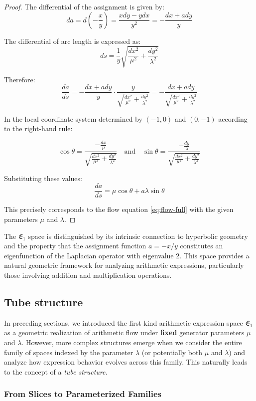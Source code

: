 \documentclass[12pt]{article}
\begin{document}
\begin{proof}
The differential of the assignment is given by:
$$
da = d\left(-\frac{x}{y}\right) = \frac{xdy - ydx}{y^2} = -\frac{dx + a dy}{y}
$$

The differential of arc length is expressed as:
$$
ds = \frac{1}{y}\sqrt{\frac{dx^2}{\mu^2} + \frac{dy^2}{\lambda^2}}
$$

Therefore:
$$
\frac{da}{ds} = - \frac{dx + a dy}{y} \cdot \frac{y}{\sqrt{\frac{dx^2}{\mu^2} + \frac{dy^2}{\lambda^2}}} = -\frac{dx + a dy}{\sqrt{\frac{dx^2}{\mu^2} + \frac{dy^2}{\lambda^2}}}
$$

In the local coordinate system determined by $(-1, 0)$ and $(0, -1)$ according to the right-hand rule:

$$
\cos \theta = \frac{-\frac{dx}{\mu}}{\sqrt{\frac{dx^2}{\mu^2} + \frac{dy^2}{\lambda^2}}} \quad \text{and} \quad \sin \theta = \frac{-\frac{dy}{\lambda}}{\sqrt{\frac{dx^2}{\mu^2} + \frac{dy^2}{\lambda^2}}}
$$

Substituting these values:
$$
\frac{da}{ds} = \mu \cos \theta + a \lambda \sin \theta
$$

This precisely corresponds to the flow equation \eqref{eq:flow-full} with the given parameters $\mu$ and $\lambda$.
\end{proof}

The $\mathfrak{E}_1$ space is distinguished by its intrinsic connection to hyperbolic geometry and the property that the assignment function $a = -x/y$ constitutes an eigenfunction of the Laplacian operator with eigenvalue 2. This space provides a natural geometric framework for analyzing arithmetic expressions, particularly those involving addition and multiplication operations.

\subsection{Tube structure}\label{sec:tubestructure-full}

In preceding sections, we introduced the first kind arithmetic expression space $\mathfrak{E}_1$ as a geometric realization of arithmetic flow under \textbf{fixed} generator parameters $\mu$ and $\lambda$. However, more complex structures emerge when we consider the entire family of spaces indexed by the parameter $\lambda$ (or potentially both $\mu$ and $\lambda$) and analyze how expression behavior evolves across this family. This naturally leads to the concept of a \emph{tube structure}.

\subsubsection{From Slices to Parameterized Families}\label{subsec:tube_slices-full}
\end{document}
